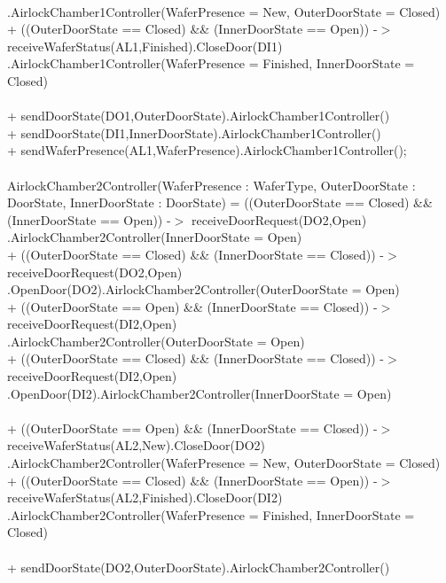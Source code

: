 \documentclass[a4paper,12pt]{article}
\begin{document}
	\\.AirlockChamber1Controller(WaferPresence = New, OuterDoorState = Closed)
	\\+ ((OuterDoorState == Closed) \&\& (InnerDoorState == Open)) -$>$ receiveWaferStatus(AL1,Finished).CloseDoor(DI1)\\.AirlockChamber1Controller(WaferPresence = Finished, InnerDoorState = Closed)
	\\
	\\+ sendDoorState(DO1,OuterDoorState).AirlockChamber1Controller()
	\\+ sendDoorState(DI1,InnerDoorState).AirlockChamber1Controller()
	\\+ sendWaferPresence(AL1,WaferPresence).AirlockChamber1Controller();
	\\
	\\AirlockChamber2Controller(WaferPresence : WaferType, OuterDoorState : DoorState, InnerDoorState : DoorState) =
	((OuterDoorState == Closed) \&\& (InnerDoorState == Open)) -$>$ receiveDoorRequest(DO2,Open)
	\\.AirlockChamber2Controller(InnerDoorState = Open)
	\\+ ((OuterDoorState == Closed) \&\& (InnerDoorState == Closed)) -$>$ receiveDoorRequest(DO2,Open)
	\\.OpenDoor(DO2).AirlockChamber2Controller(OuterDoorState = Open)
	\\+ ((OuterDoorState == Open) \&\& (InnerDoorState == Closed)) -$>$ receiveDoorRequest(DI2,Open)
	\\.AirlockChamber2Controller(OuterDoorState = Open)
	\\+ ((OuterDoorState == Closed) \&\& (InnerDoorState == Closed)) -$>$ receiveDoorRequest(DI2,Open)
	\\.OpenDoor(DI2).AirlockChamber2Controller(InnerDoorState = Open)
	\\
	\\+ ((OuterDoorState == Open) \&\& (InnerDoorState == Closed)) -$>$ receiveWaferStatus(AL2,New).CloseDoor(DO2)
	\\.AirlockChamber2Controller(WaferPresence = New, OuterDoorState = Closed)
	\\+ ((OuterDoorState == Closed) \&\& (InnerDoorState == Open)) -$>$ receiveWaferStatus(AL2,Finished).CloseDoor(DI2)\\.AirlockChamber2Controller(WaferPresence = Finished, InnerDoorState = Closed)
	\\
	\\+ sendDoorState(DO2,OuterDoorState).AirlockChamber2Controller()
\end{document}
